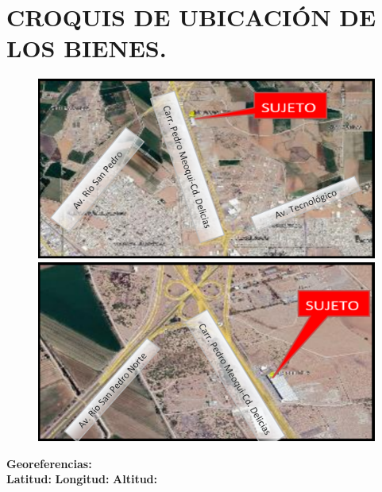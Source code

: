 \section{CROQUIS DE UBICACIÓN DE LOS BIENES.} %
\begin{figure}[hbtp!]
	\centering
	\includegraphics[width= 0.4 \linewidth, page = 1]{../0.imagenes/CAP_1/1}
	\includegraphics[width= 0.4 \linewidth, page = 1]{../0.imagenes/CAP_1/2}
\end{figure}
\textbf{Georeferencias:} \\[2mm]
\hfill 
\textbf{Latitud:} \latitud
\hfill 
\textbf{Longitud:} \longitud
\hfill 
\textbf{Altitud:} \altitud
\hfill 

